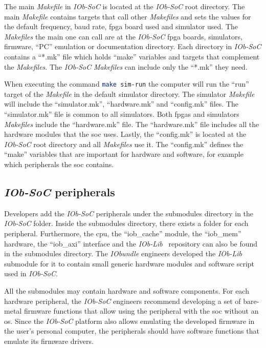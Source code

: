 The main \textit{Makefile} in \textit{IOb-SoC} is located at the \textit{IOb-SoC} root directory. The main \textit{Makefile} contains targets that call other \textit{Makefiles} and sets the values for the default frequency, baud rate, \acrshort{fpga} board used and simulator used. The \textit{Makefiles} the main one can call are at the \textit{IOb-SoC} \acrshort{fpga} boards, simulators, firmware, \enquote{PC} emulation or documentation directory. Each directory in \textit{IOb-SoC} contains a \enquote{*.mk} file which holds \enquote{make} variables and targets that complement the \textit{Makefiles}. The \textit{IOb-SoC} \textit{Makefiles} can include only the \enquote{*.mk} they need.

When executing the command \lstinline[language=bash]{make sim-run} the computer will run the \enquote{run} target of the \textit{Makefile} in the default simulator directory. The simulator \textit{Makefile} will include the \enquote{simulator.mk}, \enquote{hardware.mk} and \enquote{config.mk} files. The \enquote{simulator.mk} file is common to all simulators. Both \acrshort{fpga}s and simulators \textit{Makefiles} include the \enquote{hardware.mk} file. The \enquote{hardware.mk} file includes all the hardware modules that the \acrshort{soc} uses. Lastly, the \enquote{config.mk} is located at the \textit{IOb-SoC} root directory and all \textit{Makefiles} use it. The \enquote{config.mk} defines the \enquote{make} variables that are important for hardware and software, for example which peripherals the \acrshort{soc} contains.

\subsection{\textit{IOb-SoC} peripherals}
\label{subsection:iob_peripherals}
Developers add the \textit{IOb-SoC} peripherals under the submodules directory in the \textit{IOb-SoC} folder. Inside the submodules directory, there exists a folder for each peripheral. Furthermore, the \acrshort{cpu}, the \enquote{iob\_cache} module, the \enquote{iob\_mem} hardware, the \enquote{iob\_axi} interface and the \textit{IOb-Lib}~\cite{iob_lib} repository can also be found in the submodules directory. The \textit{IObundle} engineers developed the \textit{IOb-Lib} submodule for it to contain small generic hardware modules and software script used in \textit{IOb-SoC}.

All the submodules may contain hardware and software components. For each hardware peripheral, the \textit{IOb-SoC} engineers recommend developing a set of bare-metal firmware functions that allow using the peripheral with the \acrshort{soc} without an \acrshort{os}. Since the \textit{IOb-SoC} platform also allows emulating the developed firmware in the user's personal computer, the peripherals should have software functions that emulate its firmware drivers.

